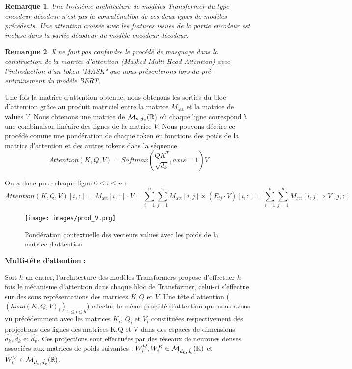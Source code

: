 \documentclass[12pt]{article}
\newtheorem{rmq}{Remarque}
\theoremstyle{definition}
\begin{document}
\begin{rmq}
	Une troisième architecture de modèles Transformer du type encodeur-décodeur n'est pas la concaténation de ces deux types de modèles précédents. Une attention croisée avec les features issues de la partie encodeur est incluse dans la partie décodeur du modèle encodeur-décodeur.
\end{rmq}

\begin{rmq}
	Il ne faut pas confondre le procédé de masquage dans la construction de la matrice d'attention (\emph{Masked Multi-Head Attention}) avec l'introduction d'un token \textit{"MASK"} que nous présenterons lors du pré-entraînement du modèle BERT.
\end{rmq}


Une fois la matrice d'attention obtenue, nous obtenons les sorties du bloc d'attention grâce au produit matriciel entre la matrice \(M_{\text{att}}\) et la matrice de values \(V\). Nous obtenons une matrice de \(\mathcal{M}_{n,d_v}(\mathbb{R})\) où chaque ligne correspond à une combinaison linéaire des lignes de la matrice \(V\). Nous pouvons décrire ce procédé comme une pondération de chaque token en fonctions des poids de la matrice d'attention et des autres tokens dans la séquence. 
$$Attention(K,Q,V) = Softmax(\dfrac{QK^T}{\sqrt{d_k}},axis = 1)V$$

On a donc pour chaque ligne $0\leq i \leq n$ :
	$$Attention(K,Q,V)[i,:] = M_{\text{att}}[i,:] \cdot V = \sum_{i=1}^{n}\sum_{j=1}^{n} M_{\text{att}}[i,j] \times \left(E_{ij}\cdot V\right)[i,:] = \sum_{i=1}^{n}\sum_{j=1}^{n} M_{\text{att}}[i,j] \times V[j,:]$$	
\begin{figure*}[!h]
	\centering
	\texttt{[image: images/prod\_V.png]}
	\caption{Pondération contextuelle des vecteurs values avec les poids de la matrice d'attention}
\end{figure*}

\textbf{Multi-tête d'attention :}

Soit $h$ un entier, l'architecture des modèles Transformers propose d'effectuer $h$ fois le mécanisme d'attention dans chaque bloc de Transformer, celui-ci s'effectue sur des sous représentations des matrices $K,Q$ et $V$. Une tête d'attention ($\left(head(K,Q,V)_i\right)_{1\leq i\leq h}$) effectue le même procédé d'attention que nous avons vu précédemment avec les matrices $K_i$, $Q_i$ et $V_i$ constituées respectivement des projections des lignes des matrices K,Q et V dans des espaces de dimensions $\hat{d_k},\hat{d_k}$ et $\hat{d_v}$. Ces projections sont effectuées par des réseaux de neurones denses associées aux matrices de poids suivantes : $W_i^Q, W_i^K\in\mathcal{M}_{d_k,\hat{d_k}}(\mathbb{R})$ et $W_i^V\in\mathcal{M}_{d_v,\hat{d_v}}(\mathbb{R})$.
\end{document}
